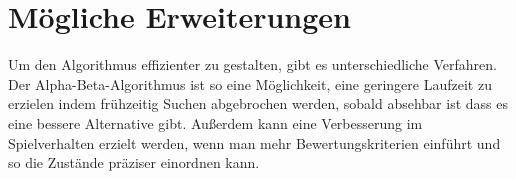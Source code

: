 
\chapter{Mögliche Erweiterungen}
\label{ch:Erweiterungen}
Um den Algorithmus effizienter zu gestalten, gibt es unterschiedliche Verfahren. Der Alpha-Beta-Algorithmus ist so eine Möglichkeit, eine geringere Laufzeit zu erzielen indem frühzeitig Suchen abgebrochen werden, sobald absehbar ist dass es eine bessere Alternative gibt. Außerdem kann eine Verbesserung im Spielverhalten erzielt werden, wenn man mehr Bewertungskriterien einführt und so die Zustände präziser einordnen kann.

